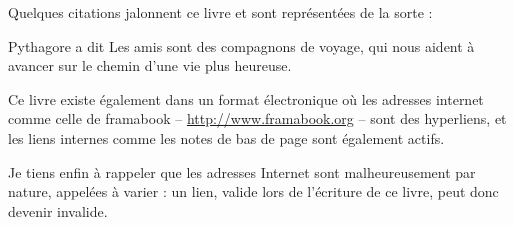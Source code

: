 Quelques citations jalonnent ce livre et sont représentées de la sorte :\par
\begin{citationlongue}{Pythagore a dit}
Les amis sont des compagnons de voyage, qui nous aident à avancer sur le chemin d'une vie plus heureuse.
\end{citationlongue}\par
Ce livre existe également dans un format électronique où les adresses internet comme celle de framabook -- \url{http://www.framabook.org} -- sont des hyperliens, et les liens internes comme les notes de bas de page sont également actifs.\par
{}
Je tiens enfin à rappeler que les adresses Internet sont malheureusement par nature, appelées à varier : un lien, valide lors de l'écriture de ce livre, peut donc devenir invalide.
